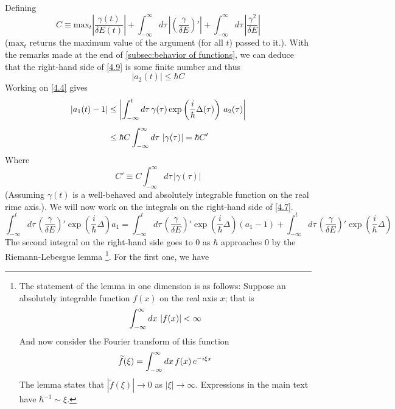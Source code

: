 \documentclass[12pt,a4paper]{article}
\begin{document}
	Defining
	\begin{equation}
		C \equiv \mathrm{max}_{t} \left| \dfrac{\gamma(t)}{\delta E(t)} \right| + \int_{-\infty}^{\infty} d\tau \, \left| \left( \dfrac{\gamma}{\delta E} \right)' \right| + \int_{-\infty}^{\infty} d\tau \, \left| \dfrac{\gamma^{2}}{\delta E} \right| \label{4.9}
	\end{equation}
	($\mathrm{max}_{t}$ returns the maximum value of the argument (for all $t$) passed to it.). With the remarks made at the end of \ref{subsec:behavior of functions}, we can deduce that the right-hand side of \eqref{4.9} is some finite number and thus
	\begin{equation}
		\left| a_{2}(t) \right| \leq \hbar C \label{4.10}
	\end{equation}
	Working on \eqref{4.4} gives
	\begin{align}
		\left| a_{1}(t) - 1 \right| &\leq \left| \int_{-\infty}^{t} d\tau \, \gamma(\tau) \exp\left( \frac{i}{\hbar} \Delta(\tau) \right) \, a_{2}(\tau) \right| \notag \\[5pt]
		&\leq \hbar C \int_{-\infty}^{\infty} d\tau \, \left| \gamma(\tau) \right| = \hbar C' \label{4.11}
	\end{align}
	Where
	\begin{equation}
		C' \equiv C \int_{-\infty}^{\infty} d\tau \, \left| \gamma(\tau) \right|
	\end{equation}
	(Assuming $\gamma(t)$ is a well-behaved and absolutely integrable function on the real rime axis.). We will now work on the integrals on the right-hand side of \eqref{4.7}.
	\begin{equation}
		\int_{-\infty}^{t} d\tau \, \left( \dfrac{\gamma}{\delta E} \right)' \exp\left( \dfrac{i}{\hbar} \Delta \right) a_{1} = \int_{-\infty}^{t} d\tau \, \left( \dfrac{\gamma}{\delta E} \right)' \exp\left( \dfrac{i}{\hbar} \Delta \right) \left( a_{1} - 1 \right) + \int_{-\infty}^{t} d\tau \, \left( \dfrac{\gamma}{\delta E} \right)' \exp\left( \dfrac{i}{\hbar} \Delta \right) \label{4.13}
	\end{equation}
	The second integral on the right-hand side goes to $0$ as $\hbar$ approaches $0$ by the Riemann-Lebesgue lemma \footnote{The statement of the lemma in one dimension is as follows: Suppose an absolutely integrable function $f(x)$ on the real axis $x$; that is
	\begin{equation}
		\int_{-\infty}^{\infty} dx\, \left| f(x) \right| < \infty \notag
	\end{equation}
	And now consider the Fourier transform of this function
	\begin{equation}
		\widetilde{f}(\xi) = \int_{-\infty}^{\infty} dx\, f(x)\, e^{-i\xi x} \notag
	\end{equation}
	The lemma states that $\left| \widetilde{f}(\xi) \right| \rightarrow 0$ as $\left| \xi \right| \rightarrow \infty$.
	Expressions in the main text have $\hbar^{-1} \sim \xi$.
	}. For the first one, we have
\end{document}
